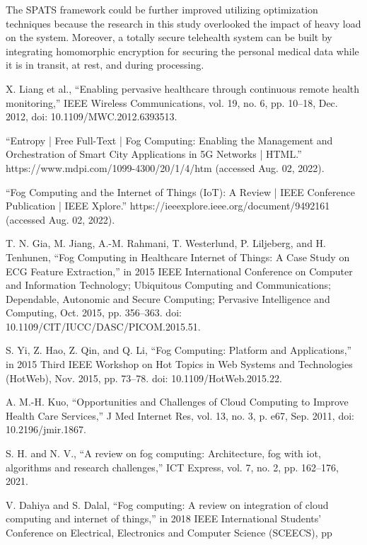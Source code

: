 \documentclass[10pt]{article}
\begin{document}
The SPATS framework could be further improved utilizing optimization techniques because the research in this study overlooked the impact of heavy load on the system. Moreover, a totally secure telehealth system can be built by integrating homomorphic encryption for securing the personal medical data while it is in transit, at rest, and during processing.


\begin{thebibliography}{40}

 X. Liang et al., “Enabling pervasive healthcare through continuous remote health monitoring,” IEEE Wireless Communications, vol. 19, no. 6, pp. 10–18, Dec. 2012, doi: 10.1109/MWC.2012.6393513.

 “Entropy | Free Full-Text | Fog Computing: Enabling the Management and Orchestration of Smart City Applications in 5G Networks | HTML.” https://www.mdpi.com/1099-4300/20/1/4/htm (accessed Aug. 02, 2022).

 “Fog Computing and the Internet of Things (IoT): A Review | IEEE Conference Publication | IEEE Xplore.” https://ieeexplore.ieee.org/document/9492161 (accessed Aug. 02, 2022).

 T. N. Gia, M. Jiang, A.-M. Rahmani, T. Westerlund, P. Liljeberg, and H. Tenhunen, “Fog Computing in Healthcare Internet of Things: A Case Study on ECG Feature Extraction,” in 2015 IEEE International Conference on Computer and Information Technology; Ubiquitous Computing and Communications; Dependable, Autonomic and Secure Computing; Pervasive Intelligence and Computing, Oct. 2015, pp. 356–363. doi: 10.1109/CIT/IUCC/DASC/PICOM.2015.51.

 S. Yi, Z. Hao, Z. Qin, and Q. Li, “Fog Computing: Platform and Applications,” in 2015 Third IEEE Workshop on Hot Topics in Web Systems and Technologies (HotWeb), Nov. 2015, pp. 73–78. doi: 10.1109/HotWeb.2015.22.

 A. M.-H. Kuo, “Opportunities and Challenges of Cloud Computing to Improve Health Care Services,” J Med Internet Res, vol. 13, no. 3, p. e67, Sep. 2011, doi: 10.2196/jmir.1867.

 S. H. and N. V., “A review on fog computing: Architecture, fog with iot, algorithms and research
challenges,” ICT Express, vol. 7, no. 2, pp. 162–176, 2021.

 V. Dahiya and S. Dalal, “Fog computing: A review on integration of cloud computing and internet of
things,” in 2018 IEEE International Students’ Conference on Electrical, Electronics and Computer
Science (SCEECS), pp


\end{thebibliography}
\end{document}
